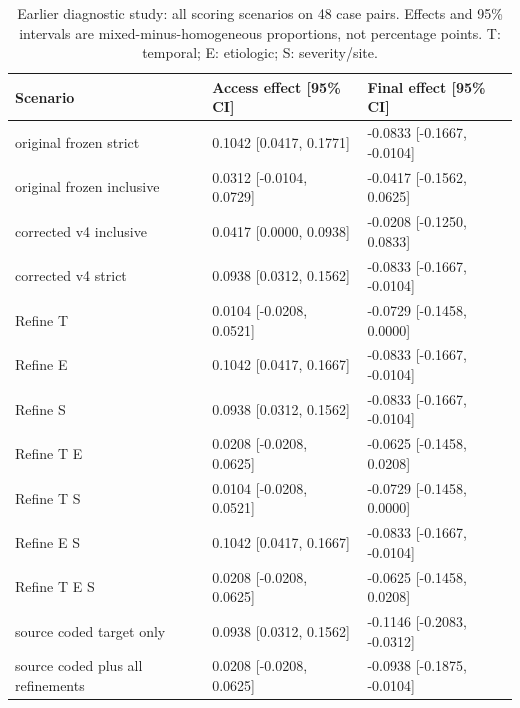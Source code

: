 \begin{table}[ht]\centering\small\caption{Earlier diagnostic study: all scoring scenarios on 48 case pairs. Effects and 95\% intervals are mixed-minus-homogeneous proportions, not percentage points. T: temporal; E: etiologic; S: severity/site.}\begin{tabular}{lll}\toprule
Scenario & Access effect [95\% CI] & Final effect [95\% CI] \\ \midrule
original frozen strict & 0.1042 [0.0417, 0.1771] & -0.0833 [-0.1667, -0.0104] \\
original frozen inclusive & 0.0312 [-0.0104, 0.0729] & -0.0417 [-0.1562, 0.0625] \\
corrected v4 inclusive & 0.0417 [0.0000, 0.0938] & -0.0208 [-0.1250, 0.0833] \\
corrected v4 strict & 0.0938 [0.0312, 0.1562] & -0.0833 [-0.1667, -0.0104] \\
Refine T & 0.0104 [-0.0208, 0.0521] & -0.0729 [-0.1458, 0.0000] \\
Refine E & 0.1042 [0.0417, 0.1667] & -0.0833 [-0.1667, -0.0104] \\
Refine S & 0.0938 [0.0312, 0.1562] & -0.0833 [-0.1667, -0.0104] \\
Refine T E & 0.0208 [-0.0208, 0.0625] & -0.0625 [-0.1458, 0.0208] \\
Refine T S & 0.0104 [-0.0208, 0.0521] & -0.0729 [-0.1458, 0.0000] \\
Refine E S & 0.1042 [0.0417, 0.1667] & -0.0833 [-0.1667, -0.0104] \\
Refine T E S & 0.0208 [-0.0208, 0.0625] & -0.0625 [-0.1458, 0.0208] \\
source coded target only & 0.0938 [0.0312, 0.1562] & -0.1146 [-0.2083, -0.0312] \\
source coded plus all refinements & 0.0208 [-0.0208, 0.0625] & -0.0938 [-0.1875, -0.0104] \\
\bottomrule\end{tabular}\end{table}
